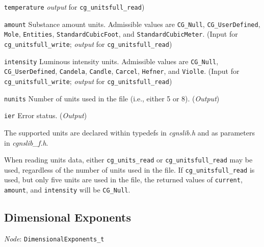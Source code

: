 \begin{Ventryi}{\texttt{temperature}}
      \textcolor{output}{\textit{output}} for \texttt{cg\_unitsfull\_read})
\item [\texttt{amount}]
      Substance amount units.
      Admissible values are \texttt{CG\_Null}, \texttt{CG\_UserDefined},
      \texttt{Mole}, \texttt{Entities}, \texttt{StandardCubicFoot}, and
      \texttt{StandardCubicMeter}.
      (\textcolor{input}{Input} for \texttt{cg\_unitsfull\_write};
      \textcolor{output}{\textit{output}} for \texttt{cg\_unitsfull\_read})
\item [\texttt{intensity}]
      Luminous intensity units.
      Admissible values are \texttt{CG\_Null}, \texttt{CG\_UserDefined},
      \texttt{Candela}, \texttt{Candle}, \texttt{Carcel},
      \texttt{Hefner}, and \texttt{Violle}.
      (\textcolor{input}{Input} for \texttt{cg\_unitsfull\_write};
      \textcolor{output}{\textit{output}} for \texttt{cg\_unitsfull\_read})
\item [\texttt{nunits}]
      Number of units used in the file (i.e., either 5 or 8).
      (\textcolor{output}{\textit{Output}})
\item [\texttt{ier}]
      Error status.
      (\textcolor{output}{\textit{Output}})
\end{Ventryi}

The supported units are declared within typedefs in \textit{cgnslib.h}
and as parameters in \textit{cgnslib\_f.h}.

When reading units data, either \texttt{cg\_units\_read} or
\texttt{cg\_unitsfull\_read} may be used, regardless of the number of
units used in the file.
If \texttt{cg\_unitsfull\_read} is used, but only five units are used
in the file, the returned values of \texttt{current}, \texttt{amount},
and \texttt{intensity} will be \texttt{CG\_Null}.

\newpage
\subsection{Dimensional Exponents}
\label{s:dimensionalexponents}

\noindent
\textit{Node}: \texttt{DimensionalExponents\_t}

